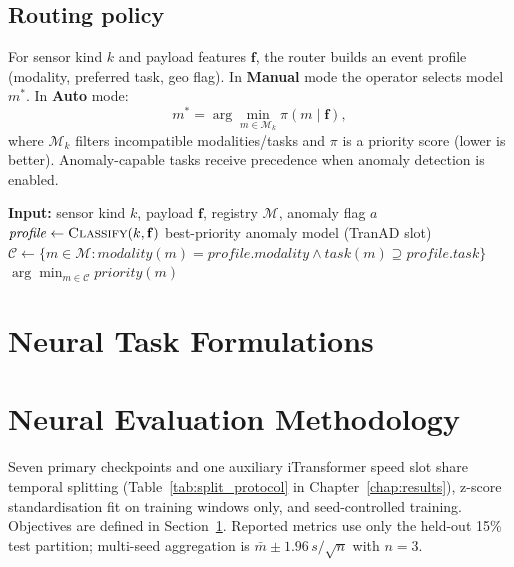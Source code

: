 \subsection{Routing policy}

For sensor kind $k$ and payload features $\mathbf{f}$, the router builds an event profile (modality, preferred task, geo flag). In \textbf{Manual} mode the operator selects model $m^{*}$. In \textbf{Auto} mode:
\begin{equation}
m^{*} = \arg\min_{m \in \mathcal{M}_k} \pi(m \mid \mathbf{f}),
\end{equation}
where $\mathcal{M}_k$ filters incompatible modalities/tasks and $\pi$ is a priority score (lower is better). Anomaly-capable tasks receive precedence when anomaly detection is enabled.

\begin{algorithm}[H]
\caption{Rule-based model routing (Auto mode)}
\label{alg:routing}
\begin{algorithmic}[1]
\State \textbf{Input:} sensor kind $k$, payload $\mathbf{f}$, registry $\mathcal{M}$, anomaly flag $a$
\State $\mathit{profile} \gets \textsc{Classify}(k, \mathbf{f})$
  \State \Return best-priority anomaly model (TranAD slot)
\EndIf
\State $\mathcal{C} \gets \{ m \in \mathcal{M} : \mathit{modality}(m)=\mathit{profile.modality} \land \mathit{task}(m)\supseteq \mathit{profile.task}\}$
\State \Return $\arg\min_{m\in\mathcal{C}} \mathit{priority}(m)$
\end{algorithmic}
\end{algorithm}

\section{Neural Task Formulations}
\label{sec:neural_formulations}



\section{Neural Evaluation Methodology}

Seven primary checkpoints and one auxiliary iTransformer speed slot share temporal splitting (Table~\ref{tab:split_protocol} in Chapter~\ref{chap:results}), z-score standardisation fit on training windows only, and seed-controlled training. Objectives are defined in Section~\ref{sec:neural_formulations}. Reported metrics use only the held-out 15\% test partition; multi-seed aggregation is $\bar{m} \pm 1.96\,s/\sqrt{n}$ with $n=3$.

